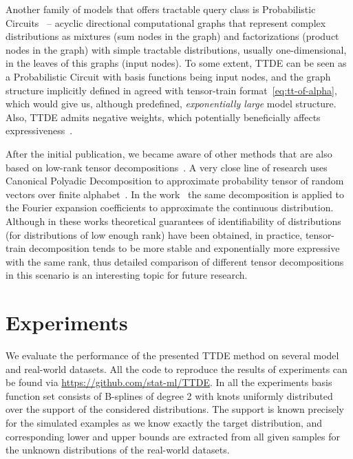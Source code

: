 \documentclass[accepted]{uai2021}
\newcommand\R{\mathbb{R}}
\begin{document}
  Another family of models that offers tractable query class is Probabilistic Circuits~\citep{choiprobabilistic} -- acyclic directional computational graphs that represent complex distributions as mixtures (sum nodes in the graph) and factorizations (product nodes in the graph) with simple tractable distributions, usually one-dimensional, in the leaves of this graphs (input nodes).
  To some extent, TTDE can be seen as a Probabilistic Circuit with basis functions being input nodes, and the graph structure implicitly defined in agreed with tensor-train format~\eqref{eq:tt-of-alpha}, which would give us, although predefined, \emph{exponentially large} model structure.
  Also, TTDE admits negative weights, which potentially beneficially affects expressiveness~\citep{dennis2016algorithms}.

  After the initial publication, we became aware of other methods that are also based on low-rank tensor decompositions~\cite{KargasSF18,KargasS19,amiridi2021lowrank}. A very close line of research uses Canonical Polyadic Decomposition to approximate probability tensor of random vectors over finite alphabet~\cite{amiridi2021lowrank}. In the work~\cite{KargasS19} the same decomposition is applied to the Fourier expansion coefficients to approximate the continuous distribution. Although in these works theoretical guarantees of identifiability of distributions (for distributions of low enough rank) have been obtained, in practice, tensor-train decomposition tends to be more stable and exponentially more expressive~\cite{Khrulkov2017} with the same rank, thus detailed comparison of different tensor decompositions in this scenario is an interesting topic for future research.

  \section{Experiments}
  \label{sec:experiments}
  We evaluate the performance of the presented TTDE method on several model and real-world datasets. All the code to reproduce the results of experiments can be found via \url{https://github.com/stat-ml/TTDE}. In all the experiments basis function set consists of B-splines of degree 2 with knots uniformly distributed over the support of the considered distributions. The support is known precisely for the simulated examples as we know exactly the target distribution, and corresponding lower and upper bounds are extracted from all given samples for the unknown distributions of the real-world datasets.
\end{document}
